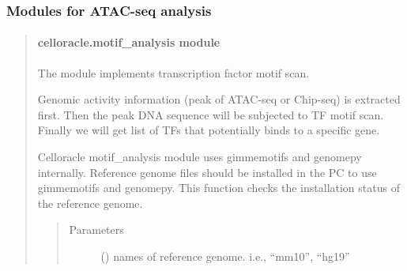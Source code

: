 \documentclass[letterpaper,10pt,english]{sphinxmanual}
\begin{document}
\subsubsection{Modules for ATAC-seq analysis}
\label{\detokenize{modules/celloracle:modules-for-atac-seq-analysis}}\begin{quote}


\paragraph{celloracle.motif\_analysis module}
\label{\detokenize{modules/celloracle.motif_analysis:module-celloracle.motif_analysis}}\label{\detokenize{modules/celloracle.motif_analysis:celloracle-motif-analysis-module}}\label{\detokenize{modules/celloracle.motif_analysis::doc}}
The {\hyperref[\detokenize{modules/celloracle.motif_analysis:module-celloracle.motif_analysis}]{}} module implements transcription factor motif scan.

Genomic activity information (peak of ATAC-seq or Chip-seq) is extracted first.
Then the peak DNA sequence will be subjected to TF motif scan.
Finally we will get list of TFs that potentially binds to a specific gene.

\begin{fulllineitems}
\label{\detokenize{modules/celloracle.motif_analysis:celloracle.motif_analysis.is_genome_installed}}
Celloracle motif\_analysis module uses gimmemotifs and genomepy internally.
Reference genome files should be installed in the PC to use gimmemotifs and genomepy.
This function checks the installation status of the reference genome.
\begin{quote}\begin{description}
\item[{Parameters}] \leavevmode
{} () \textendash{} names of reference genome. i.e., “mm10”, “hg19”

\end{description}\end{quote}


\end{fulllineitems}
\end{quote}
\end{document}
